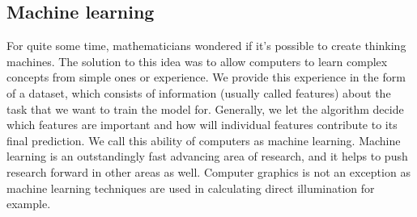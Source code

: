     \subsection{Machine learning}
    For quite some time, mathematicians wondered if it's possible to create thinking machines. The solution to this idea was to allow computers to learn complex concepts from simple ones or experience. We provide this experience in the form of a dataset, which consists of information (usually called features) about the task that we want to train the model for. Generally, we let the algorithm decide which features are important and how will individual features contribute to its final prediction. We call this ability of computers as machine learning. Machine learning is an outstandingly fast advancing area of research, and it helps to push research forward in other areas as well. Computer graphics is not an exception as machine learning techniques are used in calculating direct illumination \cite{Vevoda-rendering} for example.
